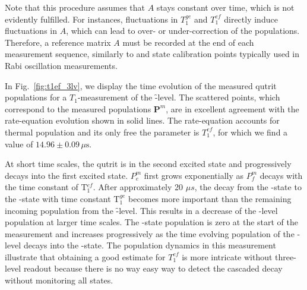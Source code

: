 Note that this procedure assumes that $A$ stays constant over time, which is not evidently fulfilled. For instances, fluctuations in $T_1^{ge}$ and $T_1^{ef}$ directly induce fluctuations in $A$, which can lead to over- or under-correction of the populations. Therefore, a reference matrix $A$ must be recorded at the end of each measurement sequence, similarly to \g{} and \e{} state calibration points typically used in Rabi oscillation measurements. 

In Fig.~\ref{fig:t1ef_3lv}, we display the time evolution of the measured qutrit populations for a $T_1$-measurement of the \f-level. The scattered points, which correspond to the measured populations $\bm{P}^m$, are in excellent agreement with the rate-equation evolution shown in solid lines. The rate-equation accounts for thermal population and its only free the parameter is $T_1^{ef}$, for which we find a value of $14.96 \pm 0.09 \,\mu\textrm{s}$. 

At short time scales, the qutrit is in the second excited state and progressively decays into the first excited state. $P_e^m$ first grows exponentially as $P_f^m$ decays with the time constant of T$_1^{ef}$. After approximately 20 $\mu s$, the decay from the \e-state to the \g-state with time constant T$_1^{ge}$ becomes more important than the remaining incoming population from the \f-level.  This results in a decrease of the \e-level population at larger time scales. The \g-state population is zero at the start of the measurement and increases progressively as the time evolving population of the \e-level decays into the \g-state. The population dynamics in this measurement illustrate that obtaining a good estimate for $T_1^{ef}$ is more intricate without three-level readout because there is no way easy way to detect the cascaded decay without monitoring all states. 



